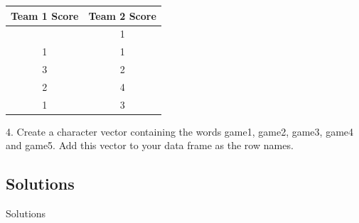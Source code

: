 \documentclass[
]{book}
\begin{document}
\begin{longtable}[]{@{}cc@{}}
\toprule\noalign{}
Team 1 Score & Team 2 Score \\
\midrule\noalign{}
\endhead
\bottomrule\noalign{}
\endlastfoot
2 & 1 \\
1 & 1 \\
3 & 2 \\
2 & 4 \\
1 & 3 \\
\end{longtable}

4. Create a character vector containing the words game1, game2, game3, game4 and game5. Add this vector to your data frame as the row names.

\subsection{Solutions}\label{solutions-4}

Solutions
\end{document}
